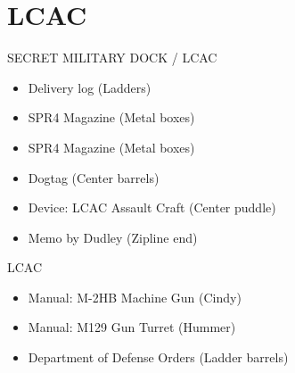 \chapter{LCAC}

\begin{subregion}{SECRET MILITARY DOCK / LCAC}
    \begin{itemize}
        \item Delivery log (Ladders)
        \item SPR4 Magazine (Metal boxes)
        \item SPR4 Magazine (Metal boxes)
        \item Dogtag (Center barrels)
        \item Device: LCAC Assault Craft (Center puddle)
        \item Memo by Dudley (Zipline end)
    \end{itemize}
\end{subregion}

\begin{subregion}{LCAC}
    \begin{itemize}
        \item Manual: M-2HB Machine Gun (Cindy)
        \item Manual: M129 Gun Turret (Hummer)
        \item Department of Defense Orders (Ladder barrels)
    \end{itemize}
\end{subregion}
